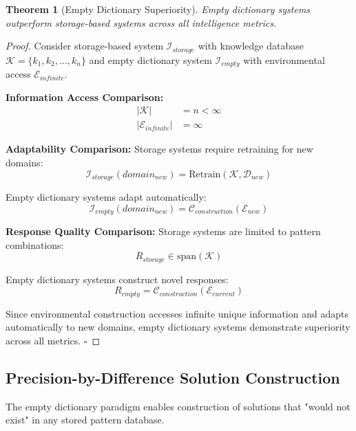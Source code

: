 \documentclass[12pt,a4paper]{article}
\newtheorem{theorem}{Theorem}
\begin{document}
\begin{theorem}[Empty Dictionary Superiority]
Empty dictionary systems outperform storage-based systems across all intelligence metrics.
\end{theorem}

\begin{proof}
Consider storage-based system $\mathcal{I}_{storage}$ with knowledge database $\mathcal{K} = \{k_1, k_2, \ldots, k_n\}$ and empty dictionary system $\mathcal{I}_{empty}$ with environmental access $\mathcal{E}_{infinite}$.

\textbf{Information Access Comparison:}
\begin{align}
|\mathcal{K}| &= n < \infty \\
|\mathcal{E}_{infinite}| &= \infty
\end{align}

\textbf{Adaptability Comparison:}
Storage systems require retraining for new domains:
\begin{equation}
\mathcal{I}_{storage}(domain_{new}) = \text{Retrain}(\mathcal{K}, \mathcal{D}_{new})
\end{equation}

Empty dictionary systems adapt automatically:
\begin{equation}
\mathcal{I}_{empty}(domain_{new}) = \mathcal{C}_{construction}(\mathcal{E}_{new})
\end{equation}

\textbf{Response Quality Comparison:}
Storage systems are limited to pattern combinations:
\begin{equation}
R_{storage} \in \text{span}(\mathcal{K})
\end{equation}

Empty dictionary systems construct novel responses:
\begin{equation}
R_{empty} = \mathcal{C}_{construction}(\mathcal{E}_{current})
\end{equation}

Since environmental construction accesses infinite unique information and adapts automatically to new domains, empty dictionary systems demonstrate superiority across all metrics. $\square$
\end{proof}

\subsection{Precision-by-Difference Solution Construction}

The empty dictionary paradigm enables construction of solutions that "would not exist" in any stored pattern database.
\end{document}

